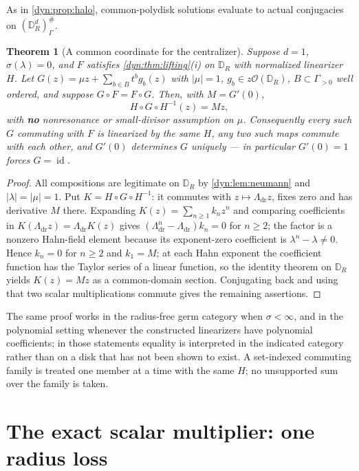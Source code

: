 \documentclass[11pt,letterpaper]{article}
\newtheorem{theorem}{Theorem}[section]
\theoremstyle{definition}
\theoremstyle{remark}
\newcommand{\OO}{\mathcal O}
\newcommand{\id}{\operatorname{id}}
\numberwithin{equation}{section}
\begin{document}
As in \cref{dyn:prop:halo}, common-polydisk solutions evaluate to actual
conjugacies on $(\mathbb D_R^{d})^{\#}_\Gamma$.

\begin{theorem}[A common coordinate for the centralizer]
\label{dyn:thm:commoncoord}
Suppose $d=1$, $\sigma(\lambda)=0$, and $F$ satisfies
\cref{dyn:thm:lifting}(i) on $\mathbb D_R$ with normalized linearizer $H$.
Let $G(z)=\mu z+\sum_{b\in B}t^{b}g_b(z)$ with $|\mu|=1$,
$g_b\in z\OO(\mathbb D_R)$, $B\subset\Gamma_{>0}$ well ordered, and suppose
$G\circ F=F\circ G$. Then, with $M=G'(0)$,
\begin{equation}\label{dyn:eq:simultaneous}
 H\circ G\circ H^{-1}(z)=Mz,
\end{equation}
with \textbf{no} nonresonance or small-divisor assumption on $\mu$.
Consequently every such $G$ commuting with $F$ is linearized by the same
$H$, any two such maps commute with each other, and $G'(0)$ determines $G$
uniquely --- in particular $G'(0)=1$ forces $G=\id$.
\end{theorem}
\begin{proof}
All compositions are legitimate on $\mathbb D_R$ by
\cref{dyn:lem:neumann} and $|\lambda|=|\mu|=1$. Put
$K=H\circ G\circ H^{-1}$: it commutes with $z\mapsto\Lambda_{\mathrm{dr}}z$,
fixes zero and has derivative $M$ there. Expanding
$K(z)=\sum_{n\ge1}k_nz^{n}$ and comparing coefficients in
$K(\Lambda_{\mathrm{dr}}z)=\Lambda_{\mathrm{dr}}K(z)$ gives
$(\Lambda_{\mathrm{dr}}^{n}-\Lambda_{\mathrm{dr}})k_n=0$ for $n\ge2$; the
factor is a nonzero Hahn-field element because its exponent-zero
coefficient is $\lambda^{n}-\lambda\ne0$. Hence $k_n=0$ for $n\ge2$ and
$k_1=M$; at each Hahn exponent the coefficient function has the Taylor
series of a linear function, so the identity theorem on $\mathbb D_R$
yields $K(z)=Mz$ as a common-domain section. Conjugating back and using
that two scalar multiplications commute gives the remaining assertions.
\end{proof}

The same proof works in the radius-free germ category when
$\sigma<\infty$, and in the polynomial setting whenever the constructed
linearizers have polynomial coefficients; in those statements equality is
interpreted in the indicated category rather than on a disk that has not
been shown to exist. A set-indexed commuting family is treated one member
at a time with the same $H$; no unsupported sum over the family is taken.

\section{The exact scalar multiplier: one radius loss}
\label{dyn:esm:sec}
\end{document}
